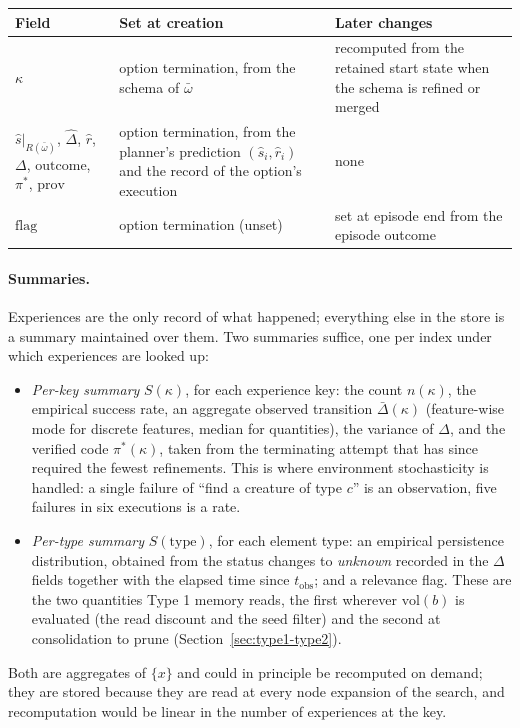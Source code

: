 \documentclass[11pt]{article}
\makeatletter
\newcommand{\Rel}{R}
\newcommand{\shat}{\hat{s}}
\newcommand{\prov}{\mathrm{prov}}
\newcommand{\vol}{\mathrm{vol}}
\newcommand{\type}{\mathrm{type}}
\newcommand{\tobs}{t_{\mathrm{obs}}}
\newenvironment{lifecycle}{\begin{center}\small\begin{tabular}{@{}>{\raggedright\arraybackslash}p{0.17\textwidth}>{\raggedright\arraybackslash}p{0.36\textwidth}>{\raggedright\arraybackslash}p{0.40\textwidth}@{}}\toprule Field & Set at creation & Later changes \\ \midrule}{\bottomrule\end{tabular}\end{center}}
\makeatother
\begin{document}
\begin{lifecycle}
$\kappa$ & option termination, from the schema of $\bar\omega$ & recomputed from the retained start state when the schema is refined or merged \\
$\shat|_{\Rel(\bar\omega)}$, $\hat\Delta$, $\hat r$, $\Delta$, $\mathrm{outcome}$, $\pi^\ast$, $\prov$ & option termination, from the planner's prediction $(\shat_i,\hat r_i)$ and the record of the option's execution & none \\
$\mathrm{flag}$ & option termination (unset) & set at episode end from the episode outcome \\
\end{lifecycle}

\paragraph{Summaries.}
Experiences are the only record of what happened; everything else in the store is a summary maintained over them. Two summaries suffice, one per index under which experiences are looked up:
\begin{itemize}[leftmargin=1.5em,itemsep=1pt]
\item \emph{Per-key summary} $S(\kappa)$, for each experience key: the count $n(\kappa)$, the empirical success rate, an aggregate observed transition $\bar\Delta(\kappa)$ (feature-wise mode for discrete features, median for quantities), the variance of $\Delta$, and the verified code $\pi^\ast(\kappa)$, taken from the terminating attempt that has since required the fewest refinements. This is where environment stochasticity is handled: a single failure of ``find a creature of type $c$'' is an observation, five failures in six executions is a rate.
\item \emph{Per-type summary} $S(\type)$, for each element type: an empirical persistence distribution, obtained from the status changes to \emph{unknown} recorded in the $\Delta$ fields together with the elapsed time since $\tobs$; and a relevance flag. These are the two quantities Type 1 memory reads, the first wherever $\vol(b)$ is evaluated (the read discount and the seed filter) and the second at consolidation to prune (Section~\ref{sec:type1-type2}).
\end{itemize}
Both are aggregates of $\{x\}$ and could in principle be recomputed on demand; they are stored because they are read at every node expansion of the search, and recomputation would be linear in the number of experiences at the key.
\end{document}
